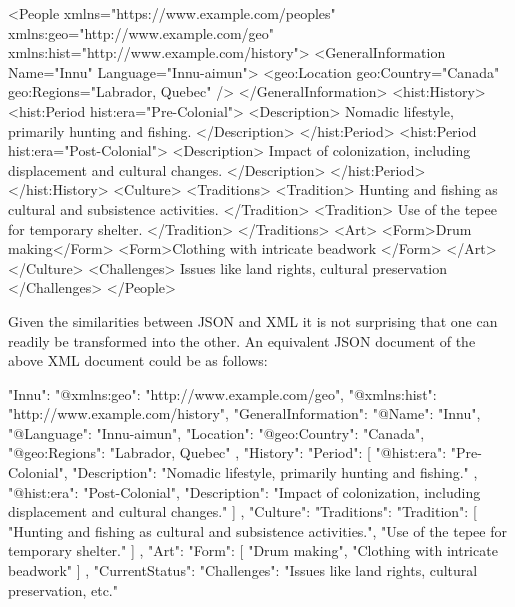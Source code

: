 \begin{samepage}
\begin{xmlcode}
<People
      xmlns="https://www.example.com/peoples"
      xmlns:geo="http://www.example.com/geo" 
      xmlns:hist="http://www.example.com/history">
    <GeneralInformation 
            Name="Innu" Language="Innu-aimun">
        <geo:Location geo:Country="Canada" 
                  geo:Regions="Labrador, Quebec" />
    </GeneralInformation>
    <hist:History>
        <hist:Period hist:era="Pre-Colonial">
            <Description>
                Nomadic lifestyle, primarily 
                hunting and fishing.
            </Description>
        </hist:Period>
        <hist:Period hist:era="Post-Colonial">
            <Description>
                Impact of colonization, 
                including displacement and 
                cultural changes.
            </Description>
        </hist:Period>
    </hist:History>
    <Culture>
        <Traditions>
            <Tradition>
                Hunting and fishing as cultural 
                and subsistence activities.
            </Tradition>
            <Tradition>
                Use of the tepee for temporary 
                shelter.
            </Tradition>
        </Traditions>
        <Art>
            <Form>Drum making</Form>
            <Form>Clothing with intricate beadwork
            </Form>
        </Art>
    </Culture>
    <Challenges>
        Issues like land rights, cultural preservation
    </Challenges>
</People>
\end{xmlcode}
\end{samepage}

Given the similarities between JSON and XML it is not surprising that one can readily be transformed into the other. An equivalent JSON document of the above XML document could be as follows:

\begin{samepage}
\begin{jsoncode}
"Innu": {
	"@xmlns:geo": "http://www.example.com/geo",
	"@xmlns:hist": "http://www.example.com/history",
	"GeneralInformation": {
		"@Name": "Innu",
		"@Language": "Innu-aimun",
		"Location": {
			"@geo:Country": "Canada",
			"@geo:Regions": "Labrador, Quebec"
		}
	},
	"History": {
		"Period": [
			{
				"@hist:era": "Pre-Colonial",
				"Description": "Nomadic lifestyle, 
				     primarily hunting and fishing."
			},
			{
				"@hist:era": "Post-Colonial",
				"Description": "Impact of colonization, 
				     including displacement and 
				     cultural changes."
			}
		]
	},
	"Culture": {
		"Traditions": {
			"Tradition": [
				"Hunting and fishing as cultural and 
				     subsistence activities.",
				"Use of the tepee for temporary shelter."
			]
		},
		"Art": {
			"Form": [
				"Drum making",
				"Clothing with intricate beadwork"
			]
		}
	},
	"CurrentStatus": {
		"Challenges": "Issues like land rights, 
		     cultural preservation, etc."
	}
}
\end{jsoncode}
\end{samepage}

